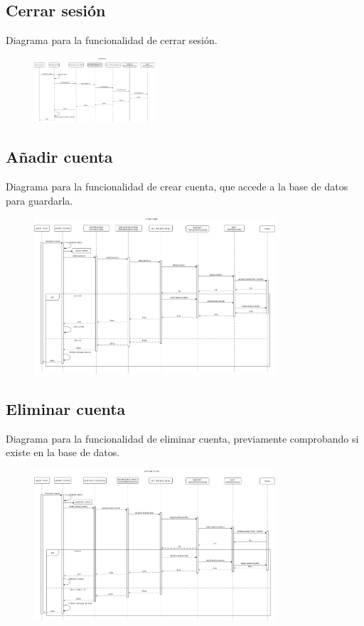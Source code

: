 \documentclass[12pt]{article}
\begin{document}
\subsection{Cerrar sesión}
Diagrama para la funcionalidad de cerrar sesión.
\begin{figure}[H]
    \centering
    \includegraphics[width=0.4\textwidth]{images/2-CerrarSesionFinal.png}
\end{figure}
\subsection{Añadir cuenta}
Diagrama para la funcionalidad de crear cuenta, que accede a la base de datos para guardarla.
\begin{figure}[H]
    \centering
    \includegraphics[width=0.8\textwidth]{images/3-crear_cuenta.png}
\end{figure}
\subsection{Eliminar cuenta}
Diagrama para la funcionalidad de eliminar cuenta, previamente comprobando si existe en la base de datos.
\begin{figure}[H]
    \centering
    \includegraphics[width=0.8\textwidth]{images/eliminar_cuenta.png}
\end{figure}
\end{document}
